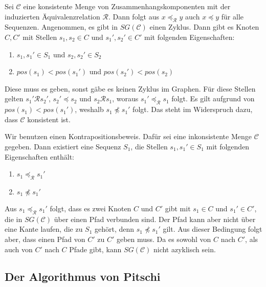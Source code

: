 \begin{beweis}
	\bewhin \hspace{2pt} Sei $\mathcal{C}$ eine konsistente Menge von Zusammenhangskomponenten mit der induzierten Äquivalenzrelation $\mathcal{R}$. Dann folgt aus $x \preceq_{\mathcal{R}} y$ auch $x \preceq y$ für alle Sequenzen. Angenommen, es gibt in $SG(\mathcal{C})$ einen Zyklus. Dann gibt es Knoten $C, C'$ mit Stellen $s_1, s_2 \in C$ und $s_1',s_2' \in C'$ mit folgenden Eigenschaften:
	\begin{enumerate}[topsep=0pt,itemsep=-1ex,partopsep=1ex,parsep=1ex]
		\item $s_1, s_1' \in S_1$ und $s_2,s_2' \in S_2$ 
		\item $pos(s_1) < pos(s_1')$ und $pos(s_2') < pos(s_2)$
	\end{enumerate}
	Diese muss es geben, sonst gäbe es keinen Zyklus im Graphen. Für diese Stellen gelten $s_1' \mathcal{R} s_2'$, $s_2' \preceq s_2$ und $s_2 \mathcal{R} s_1$, woraus $s_1' \preceq_{\mathcal{R}} s_1$ folgt. Es gilt aufgrund von $pos(s_1) < pos(s_1')$, weshalb $s_1 \npreceq s_1'$ folgt. Das steht im Widerspruch dazu, dass $\mathcal{C}$ konsistent ist.
	
	\bewrueck \hspace{2pt} Wir benutzen einen Kontrapositionsbeweis. Dafür sei eine inkonsistente Menge $\mathcal{C}$ gegeben. Dann existiert eine Sequenz $S_1$, die Stellen $s_1,s_1' \in S_1$ mit folgenden Eigenschaften enthält:
	\begin{enumerate}[topsep=0pt,itemsep=-1ex,partopsep=1ex,parsep=1ex]
		\item $s_1 \preceq_{\mathcal{R}} s_1'$
		\item $s_1 \npreceq s_1'$
	\end{enumerate}
	Aus $s_1 \preceq_{\mathcal{R}} s_1'$ folgt, dass es zwei Knoten $C$ und $C'$ gibt mit $s_1 \in C$ und $s_1' \in C'$, die in $SG(\mathcal{C})$ über einen Pfad verbunden sind. Der Pfad kann aber nicht über eine Kante laufen, die zu $S_1$ gehört, denn $s_1 \npreceq s_1'$ gilt. Aus dieser Bedingung folgt aber, dass einen Pfad von $C'$ zu $C'$ geben muss. Da es sowohl von $C$ nach $C'$, als auch von $C'$ nach $C$ Pfade gibt, kann $SG(\mathcal{C})$ nicht azyklisch sein.
\end{beweis}

\subsection{Der Algorithmus von Pitschi}

